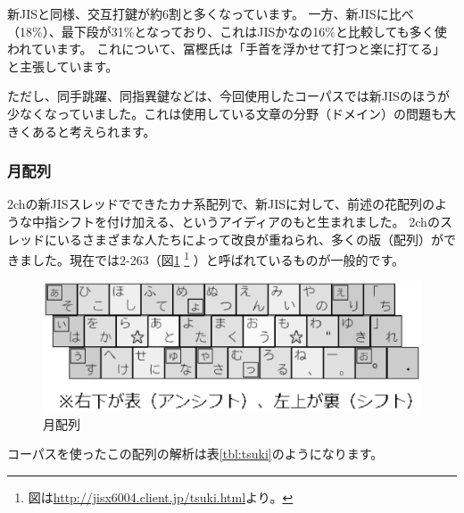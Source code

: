 新JISと同様、交互打鍵が約6割と多くなっています。
一方、新JISに比べ（18\%）、最下段が31\%となっており、これはJISかなの16\%と比較しても多く使われています。
これについて、冨樫氏は「手首を浮かせて打つと楽に打てる」と主張しています。

ただし、同手跳躍、同指異鍵などは、今回使用したコーパスでは新JISのほうが少なくなっていました。これは使用している文章の分野（ドメイン）の問題も大きくあると考えられます。

\subsubsection*{月配列}

2chの新JISスレッドでできたカナ系配列で、新JISに対して、前述の花配列のような中指シフトを付け加える、というアイディアのもと生まれました。
2chのスレッドにいるさまざまな人たちによって改良が重ねられ、多くの版（配列）ができました。現在では2-263（図\ref{fig:tsuki}%
\footnote{図は\url{http://jisx6004.client.jp/tsuki.html}より。}%
）と呼ばれているものが一般的です。

\begin{figure}[htbp]
 \begin{center}
  \includegraphics[width=0.8\hsize]{tsuki.eps}
 \end{center}
 \caption{月配列}
 \label{fig:tsuki}
\end{figure}

コーパスを使ったこの配列の解析は表\ref{tbl:tsuki}のようになります。

